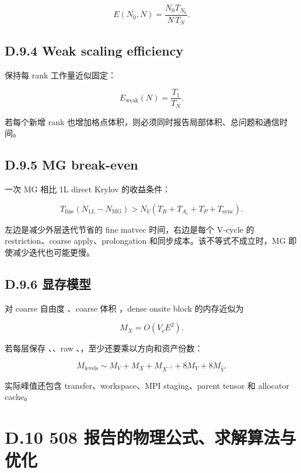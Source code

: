 \documentclass[UTF8,a4paper,10pt]{ctexart}
\DeclareRobustCommand{\pycode}[1]{\texorpdfstring{\texttt{\seqsplit{#1}}}{#1}}
\begin{document}
\begin{displaymath}
E(N_0,N) =\frac{N_0T_{N_0}}{N\,T_N}.
\end{displaymath}

\subsection{D.9.4 Weak scaling efficiency}
保持每 rank 工作量近似固定：

\begin{displaymath}
E_{\mathrm{weak}}(N) =\frac{T_1}{T_N}.
\end{displaymath}

若每个新增 rank 也增加格点体积，则必须同时报告局部体积、总问题和通信时间。

\subsection{D.9.5 MG break-even}
一次 MG 相比 1L direct Krylov 的收益条件：

\begin{displaymath}
T_{\mathrm{fine}}(N_{1L}-N_{\mathrm{MG}}) > N_V\left( T_R+T_{A_c}+T_P+T_{\mathrm{sync}} \right).
\end{displaymath}

左边是减少外层迭代节省的 fine matvec 时间，右边是每个 V-cycle 的 restriction、coarse apply、prolongation 和同步成本。该不等式不成立时，MG 即使减少迭代也可能更慢。

\subsection{D.9.6 显存模型}
对 coarse 自由度 \pycode{E}、coarse 体积 \pycode{V\_c}，dense onsite block 的内存近似为

\begin{displaymath}
M_X=O(V_cE^2).
\end{displaymath}

若每层保存 \pycode{X}、\pycode{X\textasciicircum{}-1}、raw \pycode{Y}、\pycode{Yhat}，至少还要乘以方向和资产份数：

\begin{displaymath}
M_{\mathrm{levels}} \sim M_V+M_X+M_{X^{-1}}+8M_Y+8M_{\hat Y}.
\end{displaymath}

实际峰值还包含 transfer、workspace、MPI staging、parent tensor 和 allocator cache。

\section{D.10 508 报告的物理公式、求解算法与优化}
\end{document}
